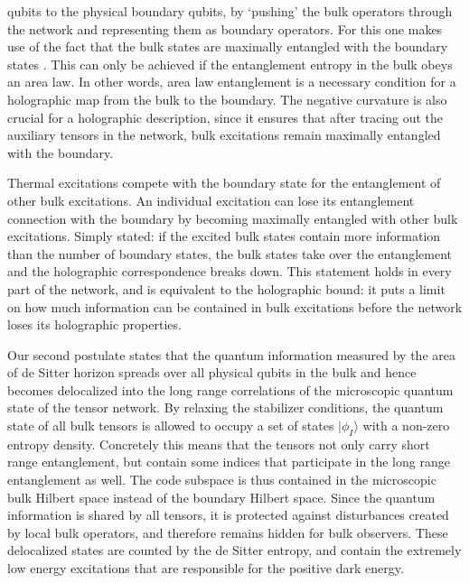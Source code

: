 \documentclass[a4paper,12pt]{article}
\begin{document}
 qubits to the physical boundary qubits, by `pushing' the bulk operators through the network 
 and representing them as boundary operators. For this one makes use of the fact that the 
 bulk states are maximally entangled with the boundary states \cite{HarlowPreskill, 
 Haydenetal}.   This can only be achieved if the entanglement entropy in the 
 bulk obeys an area law. In other words, area law entanglement is a necessary condition for a holographic map from the bulk to the boundary. The negative curvature is also crucial 
 for a holographic description, since it ensures that after tracing out the auxiliary 
 tensors in the network, bulk excitations remain maximally entangled with the boundary. 


 
Thermal excitations compete with the boundary state for the entanglement of other bulk excitations. An individual excitation can lose its entanglement connection with the boundary by becoming maximally entangled with other bulk excitations. Simply stated: if the excited bulk states contain more information than the number of boundary states, the bulk states take over the entanglement and the holographic correspondence breaks down. This statement holds in every part of the network, and is equivalent to the  holographic bound: it puts a limit on how much information can be contained in bulk excitations before the network loses its holographic properties.

Our second postulate  states that  the quantum information measured by the area of de Sitter horizon spreads over all physical qubits in the bulk and hence becomes delocalized into the long range correlations of the microscopic quantum state of the tensor network.  By relaxing the stabilizer conditions, the quantum state of all bulk tensors %
 is allowed to occupy a set of states $|\phi_I\rangle$ 
with a non-zero entropy density. Concretely this means that the tensors not only carry short range entanglement, but contain some indices that participate in the long range entanglement as well. The code subspace is thus contained in the microscopic bulk Hilbert space instead of the boundary Hilbert space. Since the quantum information is shared by all tensors, it is protected against disturbances created by local bulk operators, and therefore remains hidden for bulk observers. These delocalized states are counted by the de Sitter entropy, and contain the extremely low energy excitations that are responsible for the positive dark energy.  
 
\end{document}
